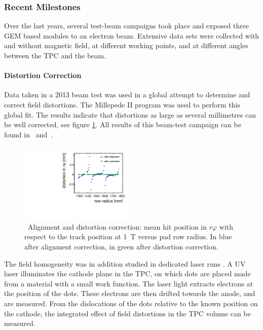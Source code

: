 \subsubsection{Recent Milestones}
Over the last years, several test-beam campaigns took place and exposed three GEM based modules to an electron beam. Extensive data sets were collected with and without magnetic field, at different working points, and at different angles between the TPC and the beam.

\paragraph{Distortion Correction}
Data taken in a 2013 beam test was used in a global attempt to determine and correct field distortions. 
The Millepede II \cite{Blobel20065,millepedeWiki} program was used to perform this global fit. 
The results indicate that distortions as large as several millimetres can be well corrected, see figure \ref{fig:1Tdistort}. 
All results of this beam-test campaign can be found in~\cite{FMueller2017} and~\cite{Mueller:301339}.

\begin{figure}[tbhp!]
\centering
\includegraphics[width=0.48\textwidth]{Tracker/TPC_Bonn/plots/TPC-DG_distortionAlignmentPaper1Tdistcor.pdf}
\caption{\small~Alignment and distortion correction: mean hit position in $r\varphi$ with respect to the track position at \SI{1}{T} versus pad row radius. In blue after alignment correction, in green after distortion correction.}
\label{fig:1Tdistort}
\end{figure}

The field homogeneity was in addition studied in dedicated laser runs \cite{Zenker:2014qra}. A UV laser illuminates the cathode plane in the TPC, on which dots are placed made from a material with a small work function. The laser light extracts electrons at the position of the dots. These electrons are then drifted towards the anode, and are measured. From the dislocations of the dots relative to the known position on the cathode, the integrated effect of field distortions in the TPC volume can be measured.

